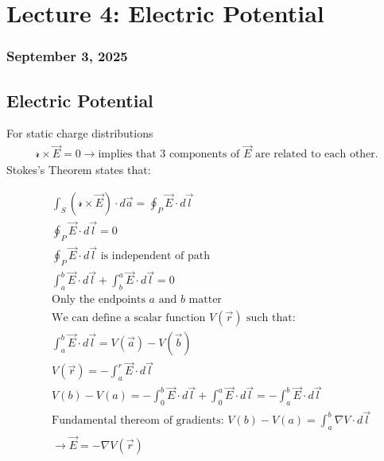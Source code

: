 \documentclass{article}
\begin{document}
\section{Lecture 4: Electric Potential}
\subsubsection*{September 3, 2025}

\subsection{Electric Potential}
For static charge distributions
\begin{align*}
    \mathcal{r}\times\vec{E} = 0 \rightarrow \text{implies that 3 components of $\vec{E}$ are related to each other.}
\end{align*}
Stokes's Theorem states that:
\begin{center}
\begin{align*}
    &\int_S (\mathcal{r} \times \vec{E}) \cdot d\vec{a} = \oint_P \vec{E} \cdot d\vec{l} \\[1.5ex]
    &\oint_P \vec{E} \cdot d\vec{l} = 0 \\[1.5ex]
    &\oint_P \vec{E} \cdot d\vec{l} \text{ is independent of path} \\[1.5ex]
    &\int_a^b \vec{E} \cdot d\vec{l} + \int_b^a \vec{E} \cdot d\vec{l} = 0 \\[1.5ex]
    &\text{Only the endpoints $a$ and $b$ matter} \\[1.5ex]
    &\text{We can define a scalar function $V(\vec{r})$ such that:} \\[0.5ex]
    &\int_a^b \vec{E} \cdot d\vec{l} = V(\vec{a}) - V(\vec{b}) \\
    &V(\vec{r}) = - \int_a^r \vec{E} \cdot d\vec{l} \\
    &V(b)-V(a)=-\int_0^b \vec{E} \cdot d\vec{l}+\int_0^a \vec{E} \cdot d\vec{l}=-\int_a^b \vec{E} \cdot d\vec{l} \\
    &\text{Fundamental thereom of gradients: } V(b)-V(a)=\int_a^b\nabla V\cdot d\vec{l} \\
    &\rightarrow \vec{E}=-\nabla V(\vec{r})
\end{align*}
\end{center}
\end{document}
